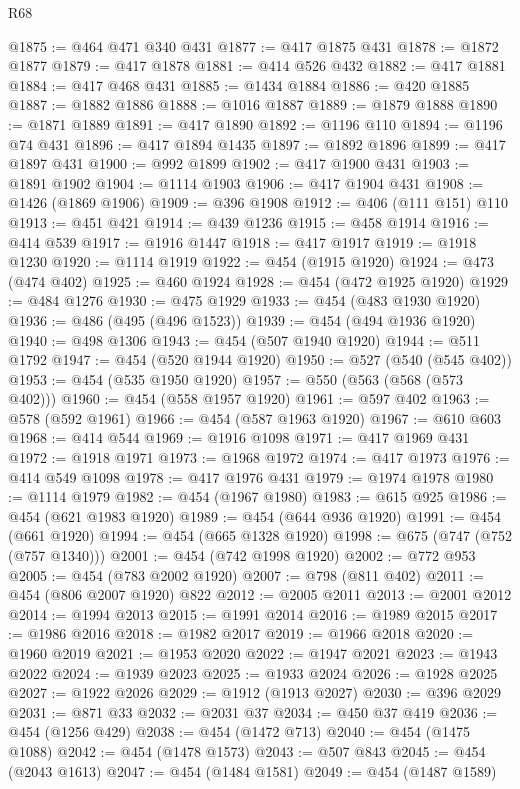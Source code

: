 \begin{lexlean}{R68}
\begin{coremodule}
@1875 := @464 @471 @340 @431
@1877 := @417 @1875 @431
@1878 := @1872 @1877
@1879 := @417 @1878
@1881 := @414 @526 @432
@1882 := @417 @1881
@1884 := @417 @468 @431
@1885 := @1434 @1884
@1886 := @420 @1885
@1887 := @1882 @1886
@1888 := @1016 @1887
@1889 := @1879 @1888
@1890 := @1871 @1889
@1891 := @417 @1890
@1892 := @1196 @110
@1894 := @1196 @74 @431
@1896 := @417 @1894 @1435
@1897 := @1892 @1896
@1899 := @417 @1897 @431
@1900 := @992 @1899
@1902 := @417 @1900 @431
@1903 := @1891 @1902
@1904 := @1114 @1903
@1906 := @417 @1904 @431
@1908 := @1426 (@1869 @1906)
@1909 := @396 @1908
@1912 := @406 (@111 @151) @110
@1913 := @451 @421
@1914 := @439 @1236
@1915 := @458 @1914
@1916 := @414 @539
@1917 := @1916 @1447
@1918 := @417 @1917
@1919 := @1918 @1230
@1920 := @1114 @1919
@1922 := @454 (@1915 @1920)
@1924 := @473 (@474 @402)
@1925 := @460 @1924
@1928 := @454 (@472 @1925 @1920)
@1929 := @484 @1276
@1930 := @475 @1929
@1933 := @454 (@483 @1930 @1920)
@1936 := @486 (@495 (@496 @1523))
@1939 := @454 (@494 @1936 @1920)
@1940 := @498 @1306
@1943 := @454 (@507 @1940 @1920)
@1944 := @511 @1792
@1947 := @454 (@520 @1944 @1920)
@1950 := @527 (@540 (@545 @402))
@1953 := @454 (@535 @1950 @1920)
@1957 := @550 (@563 (@568 (@573 @402)))
@1960 := @454 (@558 @1957 @1920)
@1961 := @597 @402
@1963 := @578 (@592 @1961)
@1966 := @454 (@587 @1963 @1920)
@1967 := @610 @603
@1968 := @414 @544
@1969 := @1916 @1098
@1971 := @417 @1969 @431
@1972 := @1918 @1971
@1973 := @1968 @1972
@1974 := @417 @1973
@1976 := @414 @549 @1098
@1978 := @417 @1976 @431
@1979 := @1974 @1978
@1980 := @1114 @1979
@1982 := @454 (@1967 @1980)
@1983 := @615 @925
@1986 := @454 (@621 @1983 @1920)
@1989 := @454 (@644 @936 @1920)
@1991 := @454 (@661 @1920)
@1994 := @454 (@665 @1328 @1920)
@1998 := @675 (@747 (@752 (@757 @1340)))
@2001 := @454 (@742 @1998 @1920)
@2002 := @772 @953
@2005 := @454 (@783 @2002 @1920)
@2007 := @798 (@811 @402)
@2011 := @454 (@806 @2007 @1920) @822
@2012 := @2005 @2011
@2013 := @2001 @2012
@2014 := @1994 @2013
@2015 := @1991 @2014
@2016 := @1989 @2015
@2017 := @1986 @2016
@2018 := @1982 @2017
@2019 := @1966 @2018
@2020 := @1960 @2019
@2021 := @1953 @2020
@2022 := @1947 @2021
@2023 := @1943 @2022
@2024 := @1939 @2023
@2025 := @1933 @2024
@2026 := @1928 @2025
@2027 := @1922 @2026
@2029 := @1912 (@1913 @2027)
@2030 := @396 @2029
@2031 := @871 @33
@2032 := @2031 @37
@2034 := @450 @37 @419
@2036 := @454 (@1256 @429)
@2038 := @454 (@1472 @713)
@2040 := @454 (@1475 @1088)
@2042 := @454 (@1478 @1573)
@2043 := @507 @843
@2045 := @454 (@2043 @1613)
@2047 := @454 (@1484 @1581)
@2049 := @454 (@1487 @1589)

\end{coremodule}
\end{lexlean}
